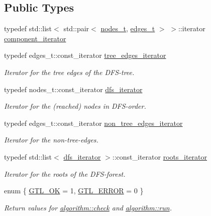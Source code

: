 \subsection*{Public Types}
\begin{DoxyCompactItemize}
\item 
typedef std\+::list$<$ std\+::pair$<$ \mbox{\hyperlink{edge_8h_a22ac17689106ba21a84e7bc54d1199d6}{nodes\+\_\+t}}, \mbox{\hyperlink{edge_8h_a8f9587479bda6cf612c103494b3858e3}{edges\+\_\+t}} $>$ $>$\+::iterator \mbox{\hyperlink{classcomponents_a0954ef13f83f3c1ac6cd4474cac17a36}{component\+\_\+iterator}}
\item 
typedef edges\+\_\+t\+::const\+\_\+iterator \mbox{\hyperlink{classdfs_accde8d5403404f6d22fe4756d4ffedd5}{tree\+\_\+edges\+\_\+iterator}}
\begin{DoxyCompactList}\small\item\em Iterator for the tree edges of the D\+F\+S-\/tree. \end{DoxyCompactList}\item 
typedef nodes\+\_\+t\+::const\+\_\+iterator \mbox{\hyperlink{classdfs_a15fe023a5a1f7ddda00f3d87110d9a32}{dfs\+\_\+iterator}}
\begin{DoxyCompactList}\small\item\em Iterator for the (reached) nodes in D\+F\+S-\/order. \end{DoxyCompactList}\item 
typedef edges\+\_\+t\+::const\+\_\+iterator \mbox{\hyperlink{classdfs_a95e353f354d3b31daded0c4fe749171a}{non\+\_\+tree\+\_\+edges\+\_\+iterator}}
\begin{DoxyCompactList}\small\item\em Iterator for the non-\/tree-\/edges. \end{DoxyCompactList}\item 
typedef std\+::list$<$ \mbox{\hyperlink{classdfs_a15fe023a5a1f7ddda00f3d87110d9a32}{dfs\+\_\+iterator}} $>$\+::const\+\_\+iterator \mbox{\hyperlink{classdfs_a1ea6e8eb2766ac95ac48a8523359065a}{roots\+\_\+iterator}}
\begin{DoxyCompactList}\small\item\em Iterator for the roots of the D\+F\+S-\/forest. \end{DoxyCompactList}\item 
enum \{ \mbox{\hyperlink{classalgorithm_af1a0078e153aa99c24f9bdf0d97f6710a5114c20e4a96a76b5de9f28bf15e282b}{G\+T\+L\+\_\+\+OK}} = 1, 
\mbox{\hyperlink{classalgorithm_af1a0078e153aa99c24f9bdf0d97f6710a6fcf574690bbd6cf710837a169510dd7}{G\+T\+L\+\_\+\+E\+R\+R\+OR}} = 0
 \}
\begin{DoxyCompactList}\small\item\em Return values for \mbox{\hyperlink{classalgorithm_a76361fb03ad1cf643affc51821e43bed}{algorithm\+::check}} and \mbox{\hyperlink{classalgorithm_a734b189509a8d6b56b65f8ff772d43ca}{algorithm\+::run}}. \end{DoxyCompactList}\end{DoxyCompactItemize}
